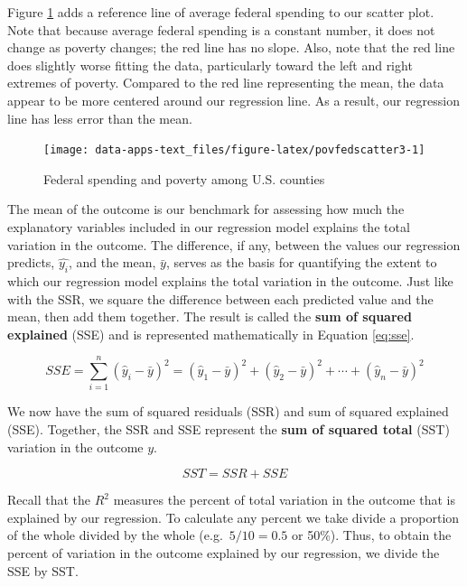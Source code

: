 \documentclass[
]{book}
\begin{document}
Figure \ref{fig:povfedscatter3} adds a reference line of average federal spending to our scatter plot. Note that because average federal spending is a constant number, it does not change as poverty changes; the red line has no slope. Also, note that the red line does slightly worse fitting the data, particularly toward the left and right extremes of poverty. Compared to the red line representing the mean, the data appear to be more centered around our regression line. As a result, our regression line has less error than the mean.

\begin{figure}

{\centering \texttt{[image: data-apps-text\_files/figure-latex/povfedscatter3-1]} 

}

\caption{Federal spending and poverty among U.S. counties}\label{fig:povfedscatter3}
\end{figure}

The mean of the outcome is our benchmark for assessing how much the explanatory variables included in our regression model explains the total variation in the outcome. The difference, if any, between the values our regression predicts, \(\hat{y_i}\), and the mean, \(\bar{y}\), serves as the basis for quantifying the extent to which our regression model explains the total variation in the outcome. Just like with the SSR, we square the difference between each predicted value and the mean, then add them together. The result is called the \textbf{sum of squared explained} (SSE) and is represented mathematically in Equation \eqref{eq:sse}.

\begin{equation}
SSE=\sum _{i=1}^{n}(\hat{y}_{i}-\bar{y})^2= (\hat{y}_{1}-\bar{y})^2+(\hat{y}_{2}-\bar{y})^2+\cdots +(\hat{y}_{n}-\bar{y})^2
\label{eq:sse}
\end{equation}

We now have the sum of squared residuals (SSR) and sum of squared explained (SSE). Together, the SSR and SSE represent the \textbf{sum of squared total} (SST) variation in the outcome \(y\).

\begin{equation}
SST = SSR + SSE
\label{eq:sst}
\end{equation}

Recall that the \(R^2\) measures the percent of total variation in the outcome that is explained by our regression. To calculate any percent we take divide a proportion of the whole divided by the whole (e.g.~\(5/10 = 0.5\) or 50\%). Thus, to obtain the percent of variation in the outcome explained by our regression, we divide the SSE by SST.
\end{document}
